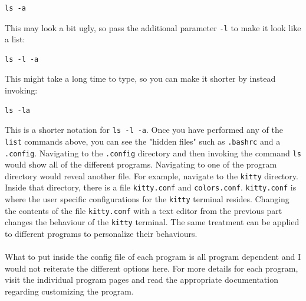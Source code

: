\documentclass[a4paper, 12pt]{report}
\begin{document}
\begin{center}
\begin{lstlisting}
ls -a
\end{lstlisting}
This may look a bit ugly, so pass the additional parameter \texttt{-l} to make it look like a list:
\begin{lstlisting}
ls -l -a
\end{lstlisting}    
This might take a long time to type, so you can make it shorter by instead invoking:
\begin{lstlisting}
ls -la
\end{lstlisting}
This is a shorter notation for \texttt{ls -l -a}. Once you have performed any of the \texttt{list} commands above, you can see the "hidden files" such as \texttt{.bashrc} and a \texttt{.config}. Navigating to the \texttt{.config} directory and then invoking the command \texttt{ls} would show all of the different programs. Navigating to one of the program directory would reveal another file. For example, navigate to the \texttt{kitty} directory. Inside that directory, there is a file \texttt{kitty.conf} and \texttt{colors.conf}. \texttt{kitty.conf} is where the user specific configurations for the \texttt{kitty} terminal resides. Changing the contents of the file \texttt{kitty.conf} with a text editor from the previous part changes the behaviour of the \texttt{kitty} terminal. The same treatment can be applied to different programs to personalize their behaviours. 
\\~\\What to put inside the config file of each program is all program dependent and I would not reiterate the different options here. For more details for each program, visit the individual program pages and read the appropriate documentation regarding customizing the program.


\end{center}
\end{document}
